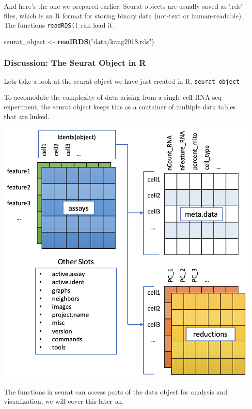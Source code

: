 \documentclass[
]{book}
\newenvironment{Shaded}{\begin{snugshade}}{\end{snugshade}}
\newcommand{\FunctionTok}[1]{\textcolor[rgb]{0.13,0.29,0.53}{\textbf{#1}}}
\newcommand{\NormalTok}[1]{#1}
\newcommand{\OtherTok}[1]{\textcolor[rgb]{0.56,0.35,0.01}{#1}}
\newcommand{\StringTok}[1]{\textcolor[rgb]{0.31,0.60,0.02}{#1}}
\begin{document}
And here's the one we prepared earlier. Seurat objects are usually saved as `.rds' files, which is an R format for storing binary data (not-text or human-readable). The functions \texttt{readRDS()} can load it.

\begin{Shaded}
\begin{Highlighting}[]
\NormalTok{seurat\_object }\OtherTok{\textless{}{-}} \FunctionTok{readRDS}\NormalTok{(}\StringTok{"data/kang2018.rds"}\NormalTok{)}
\end{Highlighting}
\end{Shaded}

\subsubsection*{Discussion: The Seurat Object in R}\label{discussion-the-seurat-object-in-r}

Lets take a look at the seurat object we have just created in R, \texttt{seurat\_object}

To accomodate the complexity of data arising from a single cell RNA seq experiment, the seurat object keeps this as a container of multiple data tables that are linked.

\includegraphics[width=0.8\linewidth,height=\textheight,keepaspectratio]{images/seuratobject.png}

The functions in seurat can access parts of the data object for analysis and visualization, we will cover this later on.
\end{document}
